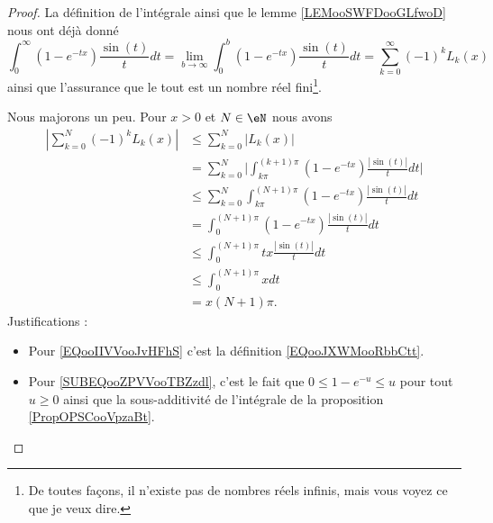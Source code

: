 \begin{proof}
	La définition de l'intégrale ainsi que le lemme \ref{LEMooSWFDooGLfwoD} nous ont déjà donné
	\begin{equation}
		\int_0^{\infty}(1- e^{-tx})\frac{ \sin(t) }{ t }dt=\lim_{b\to \infty} \int_0^b(1- e^{-tx})\frac{ \sin(t) }{ t }dt=\sum_{k=0}^{\infty}(-1)^kL_k(x)
	\end{equation}
	ainsi que l'assurance que le tout est un nombre réel fini\footnote{De toutes façons, il n'existe pas de nombres réels infinis, mais vous voyez ce que je veux dire.}.

	\begin{subproof}

		Nous majorons un peu. Pour \( x>0\) et \( N\in \eN\) nous avons
		\begin{subequations}        \label{SUBEQSQooLIGNooNAzpmi}
			\begin{align}
				| \sum_{k=0}^N(-1)^kL_k(x) | & \leq \sum_{k=0}^N| L_k(x) |                                                                                         \\
				                             & =\sum_{k=0}^N\big|   \int_{k\pi}^{(k+1)\pi}(1- e^{-tx})\frac{ | \sin(t) | }{ t }dt   \big| \label{EQooIIVVooJvHFhS} \\
				                             & \leq \sum_{k=0}^N\int_{k\pi}^{(N+1)\pi}(1- e^{-tx})\frac{ | \sin(t) | }{ t }dt                                      \\
				                             & =\int_0^{(N+1)\pi}(1- e^{-tx})\frac{ | \sin(t) | }{ t }dt                                                           \\
				                             & \leq \int_0^{(N+1)\pi}tx\frac{ | \sin(t) | }{ t }dt    \label{SUBEQooZPVVooTBZzdl}                                  \\
				                             & \leq \int_0^{(N+1)\pi}xdt                                                                                           \\
				                             & =x(N+1)\pi.
			\end{align}
		\end{subequations}
		Justifications :
		\begin{itemize}
			\item Pour \eqref{EQooIIVVooJvHFhS} c'est la définition \eqref{EQooJXWMooRbbCtt}.
			\item Pour \eqref{SUBEQooZPVVooTBZzdl}, c'est le fait que \( 0\leq 1- e^{-u}\leq u\) pour tout \( u\geq 0\) ainsi que la sous-additivité de l'intégrale de la proposition \ref{PropOPSCooVpzaBt}.
		\end{itemize}


\end{subproof}
\end{proof}
